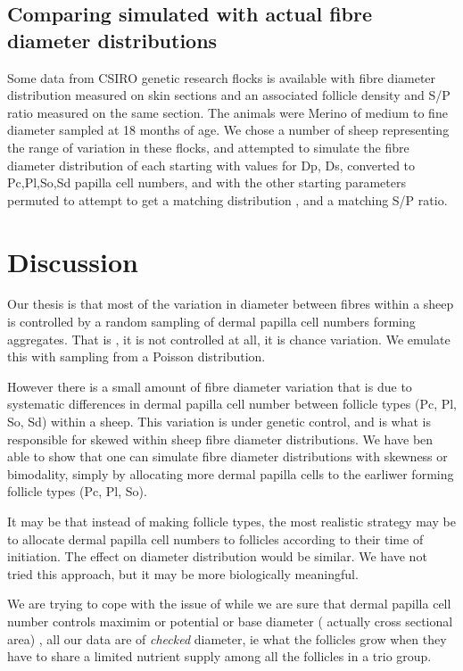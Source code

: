 \documentclass[titlepage]{article}  %
\begin{document}
\subsection{Comparing simulated with actual fibre diameter distributions}
Some data from CSIRO genetic research flocks is available with fibre diameter distribution measured on skin sections and an associated follicle density and S/P ratio measured on the same section. The animals were Merino of medium to fine diameter sampled at 18 months of age. We chose a number of sheep representing the range of variation in these flocks, and attempted to simulate the fibre diameter distribution of each starting with values for Dp, Ds, converted to Pc,Pl,So,Sd papilla cell numbers, and with the other starting parameters permuted to attempt to get a matching distribution , and a matching S/P ratio.

\clearpage
\section{Discussion}
Our thesis is that most of the variation in diameter between fibres within a sheep is controlled by a random sampling of dermal papilla cell numbers forming aggregates. That is , it is not controlled at all, it is chance variation. We emulate this with sampling from a Poisson distribution.

However there is a small amount of fibre diameter variation that is due to systematic differences in dermal papilla cell number between follicle types (Pc, Pl, So, Sd) within a sheep. This variation is under genetic control, and is what is responsible for skewed within sheep fibre diameter distributions. We have ben able to show that one can simulate fibre diameter distributions with skewness or bimodality, simply by allocating more dermal papilla cells to the earliwer forming follicle types (Pc, Pl, So).

It may be that instead of making follicle types, the most realistic strategy may be to allocate dermal papilla cell numbers to follicles according to their time of initiation. The effect on diameter distribution would be similar. We have not tried this approach, but it may be more biologically meaningful.

We are trying to cope with the issue of while we are sure that dermal papilla cell number controls maximim or potential or base diameter ( actually cross sectional area) , all our data are of {\em checked} diameter, ie what the follicles grow when they have to share a limited nutrient supply among all the follicles in a trio group.
\end{document}
